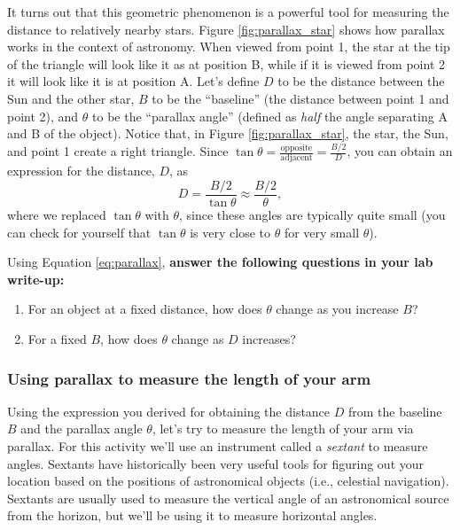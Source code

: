 \documentclass[11pt]{article}
\begin{document}
It turns out that this geometric phenomenon is a powerful tool for measuring the distance to relatively nearby stars. Figure \ref{fig:parallax_star} shows how parallax works in the context of astronomy. When viewed from point 1, the star at the tip of the triangle will look like it as at position B, while if it is viewed from point 2 it will look like it is at position A. Let's define $D$ to be the distance between the Sun and the other star, $B$ to be the ``baseline'' (the distance between point 1 and point 2), and $\theta$ to be the ``parallax angle'' (defined as \textsl{half} the angle separating A and B of the object). Notice that, in Figure \ref{fig:parallax_star}, the star, the Sun, and point 1 create a right triangle. Since $\tan\theta = \frac{\mathrm{opposite}}{\mathrm{adjacent}} = \frac{B/2}{D}$, you can obtain an expression for the distance, $D$, as 
\begin{equation} \label{eq:parallax}
    D = \frac{B/2}{\tan\theta} \approx \boxed{\frac{B/2}{\theta}},
\end{equation}
where we replaced $\tan\theta$ with $\theta$, since these angles are typically quite small (you can check for yourself that $\tan\theta$ is very close to $\theta$ for very small $\theta$).

Using Equation \ref{eq:parallax}, \textbf{answer the following questions in your lab write-up:}

\begin{enumerate}[resume]
    \item For an object at a fixed distance, how does $\theta$ change as you increase $B$? 
    
    \item For a fixed $B$, how does $\theta$ change as $D$ increases?
\end{enumerate}

\subsubsection{Using parallax to measure the length of your arm}

Using the expression you derived for obtaining the distance $D$ from the baseline $B$ and the parallax angle $\theta$, let's try to measure the length of your arm via parallax. For this activity we'll use an instrument called a \emph{sextant} to measure angles. Sextants have historically been very useful tools for figuring out your location based on the positions of astronomical objects (i.e., celestial navigation). Sextants are usually used to measure the vertical angle of an astronomical source from the horizon, but we'll be using it to measure horizontal angles. 
\end{document}
